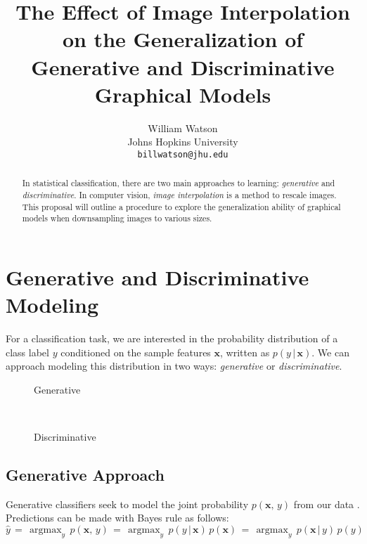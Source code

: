 \documentclass{article}
\title{The Effect of Image Interpolation on the Generalization of Generative and Discriminative Graphical Models}
\author{%
  William Watson \\
  Johns Hopkins University\\
  \texttt{billwatson@jhu.edu} \\
}
\DeclareMathOperator*{\argmax}{argmax}
\begin{document}

\maketitle

\begin{abstract}
  In statistical classification, there are two main approaches to learning:
  \textit{generative} and \textit{discriminative}. In computer vision,
  \textit{image interpolation} is a method to rescale images. This proposal will
  outline a procedure to explore the generalization ability of graphical models
  when downsampling images to various sizes.
\end{abstract}

\section{Generative and Discriminative Modeling}
For a classification task, we are interested in the probability distribution
of a class label $y$ conditioned on the sample features $\mathbf{x}$,
written as $p(y\,|\,\mathbf{x})$. We can approach modeling this
distribution in two ways: \textit{generative} or \textit{discriminative}.

\begin{figure*}[h!]
    \centering
    \begin{subfigure}[t]{0.15\textwidth}
        \centering
        \caption*{Generative}
    \end{subfigure}%
    ~
    \begin{subfigure}[t]{0.15\textwidth}
        \centering
        \caption*{Discriminative}
    \end{subfigure}
\end{figure*}

\subsection{Generative Approach}
Generative classifiers seek to
model the joint probability $p(\mathbf{x},\, y)$ from our data \cite{NgJordan}.
Predictions can be made with Bayes rule as follows:
\begin{equation}
  \hat{y} \,=\, \argmax_y \, p(\mathbf{x}, \,y) \,=\, \argmax_y \, p(y \,|\, \mathbf{x}) \, p(\mathbf{x}) \,=\, \argmax_y \, p(\mathbf{x} \,|\, y) \, p(y)
\end{equation}
\end{document}
